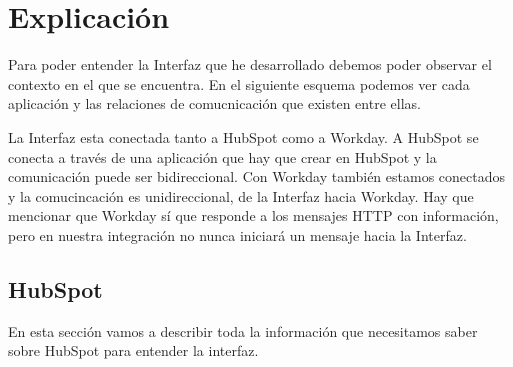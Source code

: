 









\chapter{Explicación}

Para poder entender la Interfaz que he desarrollado debemos poder observar el contexto en el que se encuentra. En el siguiente esquema podemos ver cada aplicación y las relaciones de comucnicación que existen entre ellas.

La Interfaz esta conectada tanto a HubSpot como a Workday. A HubSpot se conecta a través de una aplicación que hay que crear en HubSpot y la comunicación  puede ser bidireccional.
Con Workday también estamos conectados y la comucincación es unidireccional, de la Interfaz hacia Workday. Hay que mencionar que Workday sí que responde a los mensajes HTTP con información, pero en nuestra integración no  nunca iniciará un mensaje hacia la Interfaz.

\section{HubSpot}
En esta sección vamos a describir toda la información que necesitamos saber sobre HubSpot para entender la interfaz.

